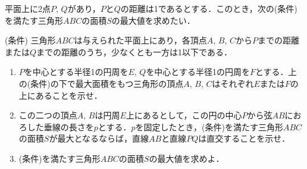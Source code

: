 \documentclass[../../main.tex]{subfiles}
\begin{document}
平面上に2点$P$, $Q$があり，$P$と$Q$の距離は1であるとする．このとき，次の(条件)を満たす三角形$ABC$の面積$S$の最大値を求めたい．

(条件) 三角形$ABC$は与えられた平面上にあり，各頂点$A$, $B$, $C$から$P$までの距離または$Q$までの距離のうち，少なくとも一方は1以下である．

\begin{enumerate}
  \item $P$を中心とする半径1の円周を$E$, $Q$を中心とする半径1の円周を$F$とする．上の(条件)の下で最大面積をもつ三角形の頂点$A$, $B$, $C$はそれぞれ$E$または$F$の上にあることを示せ．
  \item この二つの頂点$A$, $B$は円周$E$上にあるとして，この円の中心$P$から弦$AB$におろした垂線の長さを$p$とする．$p$を固定したとき，(条件)を満たす三角形$ABC$の面積$S$が最大となるならば，直線$AB$と直線$PQ$は直交することを示せ．
  \item (条件)を満たす三角形$ABC$の面積$S$の最大値を求めよ．
\end{enumerate}
\end{document}
